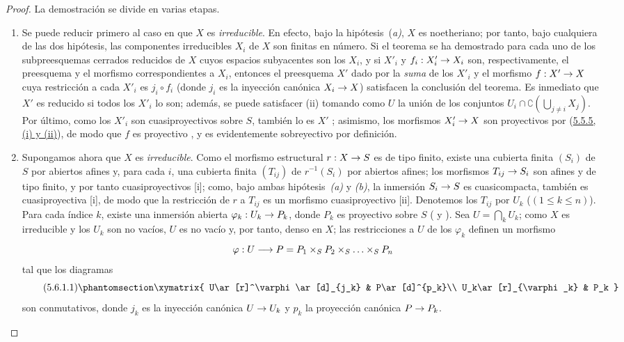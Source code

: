\documentclass[oneside,10pt]{amsart}
\makeatletter
\renewcommand{\leq}{\leqslant}
\newcommand{\ega@arrow}[2]{\mathchoice{#1}{#2}{#2}{#2}}
\renewcommand{\to}{\ega@arrow{\longrightarrow}{\rightarrow}}
\newcommand{\oldpage}[2][]{\marginnote{\normalfont\footnotesize\textbf{#1}~|~#2}\ignorespaces}
\let\EGAOriginalLabel\label
\renewcommand{\label}[1]{\phantomsection\EGAOriginalLabel{#1}}
\makeatother
\begin{document}
\begin{proof}
La demostración se divide en varias etapas.
\begin{enumerate}
  \item[(A)] Se puede reducir primero al caso en que $X$ es \emph{irreducible}.
    En efecto, bajo la hipótesis~(\emph{a)}, $X$ es noetheriano; por tanto, bajo cualquiera de las dos hipótesis, las componentes irreducibles $X_i$ de $X$ son finitas en número.
    Si el teorema se ha demostrado para cada uno de los subpreesquemas cerrados reducidos de $X$ cuyos espacios subyacentes son los $X_i$, y si $X'_i$ y $f_i:X'_i\to X_i$ son, respectivamente, el preesquema y el morfismo correspondientes a $X_i$, entonces el preesquema $X'$ dado por la \emph{suma} de los $X'_i$ y el morfismo $f:X'\to X$ cuya restricción a cada $X'_i$ es $j_i\circ f_i$ (donde $j_i$ es la inyección canónica $X_i\to X$) satisfacen la conclusión del teorema.
    Es inmediato que $X'$ es reducido si todos los $X'_i$ lo son; además, se puede satisfacer (ii) tomando como $U$ la unión de los conjuntos $U_i\cap\complement(\bigcup_{j\neq i}X_j)$.
    Por último, como los $X'_i$ son cuasiproyectivos sobre $S$, también lo es $X'$
\oldpage[II]{107}
    ; asimismo, los morfismos $X'_i\to X$ son proyectivos por (\hyperref[II.5.5.5-fr]{5.5.5, (i) y (ii)}), de modo que $f$ es proyectivo , y es evidentemente sobreyectivo por definición.

  \item[(B)] Supongamos ahora que $X$ es \emph{irreducible}.
    Como el morfismo estructural $r:X\to S$ es de tipo finito, existe una cubierta finita $(S_i)$ de $S$ por abiertos afines y, para cada $i$, una cubierta finita $(T_{ij})$ de $r^{-1}(S_i)$ por abiertos afines; los morfismos $T_{ij}\to S_i$ son afines y de tipo finito, y por tanto cuasiproyectivos [i];
    como, bajo ambas hipótesis~\emph{(a)} y \emph{(b)}, la inmersión $S_i\to S$ es cuasicompacta, también es cuasiproyectiva [i], de modo que la restricción de $r$ a $T_{ij}$ es un morfismo cuasiproyectivo [ii].
    Denotemos los $T_{ij}$ por $U_k$ ($(1\leq k\leq n)$).
    Para cada índice $k$, existe una inmersión abierta $\varphi_k:U_k\to P_k$, donde $P_k$ es proyectivo sobre $S$ ( y ).
    Sea $U=\bigcap_kU_k$; como $X$ es irreducible y los $U_k$ son no vacíos, $U$ es no vacío y, por tanto, denso en $X$; las restricciones a $U$ de los $\varphi_k$ definen un morfismo
    \[
\varphi:U\to P=P_1\times_SP_2\times_S\ldots\times_SP_n
\]
    tal que los diagramas
    \[
\tag{5.6.1.1}
\label{II.5.6.1.1-fr}
\xymatrix{
U\ar[r]^\varphi\ar[d]_{j_k} & P\ar[d]^{p_k}\\
U_k\ar[r]_{\varphi_k} & P_k
}
\]
    son conmutativos, donde $j_k$ es la inyección canónica $U\to U_k$ y $p_k$ la proyección canónica $P\to P_k$.


\end{enumerate}
\end{proof}
\end{document}
